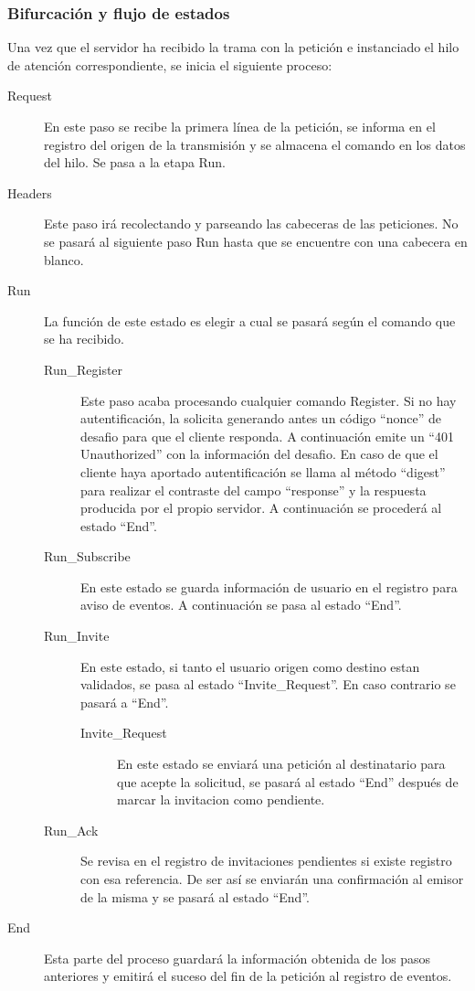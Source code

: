 \documentclass[a4paper,spanish,12pt]{book}
\begin{document}
\subsubsection{Bifurcación y flujo de estados} 
Una vez que el servidor ha recibido la trama con la petición e instanciado el hilo de atención correspondiente, se inicia el siguiente proceso:
\begin{description}
	\item[Request] En este paso se recibe la primera línea de la petición, se informa en el registro del origen de la transmisión y se almacena el comando en los datos del hilo. Se pasa a la etapa Run.
	\item[Headers] Este paso irá recolectando y parseando las cabeceras de las peticiones. No se pasará al siguiente paso Run hasta que se encuentre con una cabecera en blanco.
	\item[Run] La función de este estado es elegir a cual se pasará según el comando que se ha recibido.
	\begin{description}
		\item[Run\_Register] Este paso acaba procesando cualquier comando Register. Si no hay autentificación, la solicita generando antes un código ``nonce'' de desafio para que el cliente responda. A continuación emite un ``401 Unauthorized'' con la información del desafio. En caso de que el cliente haya aportado autentificación se llama al m\'etodo ``digest'' para realizar el contraste del campo ``response'' y la respuesta producida por el propio servidor. A continuación se procederá al estado ``End''.
		\item[Run\_Subscribe] En este estado se guarda información de usuario en el registro para aviso de eventos. A continuación se pasa al estado ``End''.
		\item[Run\_Invite] En este estado, si tanto el usuario origen como destino estan validados, se pasa al estado ``Invite\_Request''. En caso contrario se pasará a ``End''.
		\begin{description}
			\item[Invite\_Request] En este estado se enviará una petición al destinatario para que acepte la solicitud, se pasará al estado ``End'' después de marcar la invitacion como pendiente.
		\end{description}
		\item[Run\_Ack] Se revisa en el registro de invitaciones pendientes si existe registro con esa referencia. De ser así se enviarán una confirmación al emisor de la misma y se pasará al estado ``End''.
	\end{description}
	\item[End] Esta parte del proceso guardará la información obtenida de los pasos anteriores y emitirá el suceso del fin de la petición al registro de eventos.
\end{description}
\end{document}
